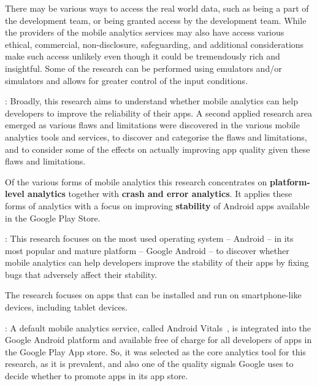 There may be various ways to access the real world data, such as being a part of the development team, or being granted access by the development team. While the providers of the mobile analytics services may also have access various ethical, commercial, non-disclosure, safeguarding, and additional considerations make such access unlikely even though it could be tremendously rich and insightful. Some of the research can be performed using emulators and/or simulators and allows for greater control of the input conditions.


: Broadly, this research aims to understand whether mobile analytics can help developers to improve the reliability of their apps. A second applied research area emerged as various flaws and limitations were discovered in the various mobile analytics tools and services, to discover and categorise the flaws and limitations, and to consider some of the effects on actually improving app quality given these flaws and limitations.

Of the various forms of mobile analytics this research concentrates on \textbf{platform-level analytics} together with \textbf{crash and error analytics}. It applies these forms of analytics with a focus on improving \textbf{stability} of Android apps available in the Google Play Store.

: This research focuses on the most used operating system -- Android -- in its most popular and mature platform -- Google Android -- to discover whether mobile analytics can help developers improve the stability of their apps by fixing bugs that adversely affect their stability.

The research focuses on apps that can be installed and run on smartphone-like devices, including tablet devices.

: A default mobile analytics service, called Android Vitals~, is integrated into the Google Android platform and available free of charge for all developers of apps in the Google Play App store. So, it was selected as the core analytics tool for this research, as it is prevalent, and also one of the quality signals Google uses to decide whether to promote apps in its app store. %

